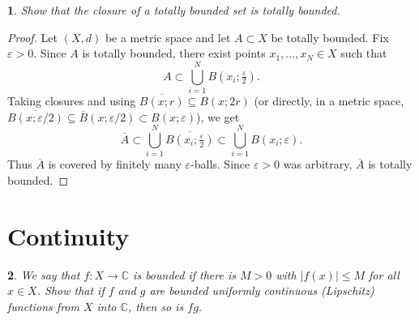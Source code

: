 \documentclass[12pt, a4paper]{report}
\theoremstyle{spaced}
\newtheorem{exercise}{}
\newcommand{\setexercise}[1]{\setcounter{exercise}{#1-1}}
\begin{document}
\setexercise{6}
\begin{exercise}
	Show that the closure of a totally bounded set is totally bounded.
\end{exercise}

\begin{proof}
	Let $(X,d)$ be a metric space and let $A\subset X$ be totally bounded.
	Fix $\varepsilon>0$. Since $A$ is totally bounded, there exist points
	$x_1,\dots,x_N\in X$ such that
	\[
		A \subset \bigcup_{i=1}^N B\!\left(x_i;\tfrac{\varepsilon}{2}\right).
	\]
	Taking closures and using $\overline{B(x;r)}\subseteq B(x;2r)$ (or directly,
	in a metric space, $\overline{B(x;\varepsilon/2)}\subseteq \overline{B}(x;\varepsilon/2)
		\subset B(x;\varepsilon)$), we get
	\[
		\overline{A}\subset \bigcup_{i=1}^N
		\overline{B\!\left(x_i;\tfrac{\varepsilon}{2}\right)}
		\subset \bigcup_{i=1}^N B(x_i;\varepsilon).
	\]
	Thus $\overline{A}$ is covered by finitely many $\varepsilon$-balls. Since
	$\varepsilon>0$ was arbitrary, $\overline{A}$ is totally bounded.
\end{proof}

\section{Continuity}

\setexercise{3}
\begin{exercise}
	We say that $f : X \to \mathbb{C}$ is bounded if there is $M>0$ with
	$|f(x)|\le M$ for all $x\in X$. Show that if $f$ and $g$ are bounded uniformly
	continuous (Lipschitz) functions from $X$ into $\mathbb{C}$, then so is $fg$.
\end{exercise}
\end{document}
